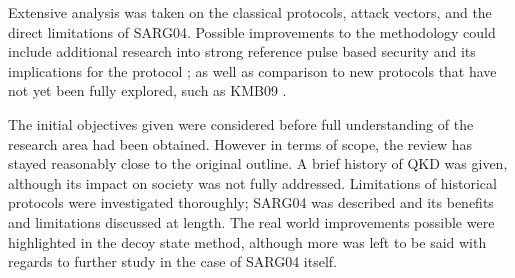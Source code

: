 \documentclass[paper=a4, fontsize=11pt]{scrartcl} %
\numberwithin{equation}{section} %
\numberwithin{figure}{section} %
\numberwithin{table}{section} %
\begin{document}
Extensive analysis was taken on the classical protocols, attack vectors, and the direct limitations of SARG04. Possible improvements
to the methodology could include additional research into strong reference pulse based security and its implications for the protocol \citep{koashi2004};
as well as comparison to new protocols that have not yet been fully explored, such as KMB09 \citep{KMB09}.

The initial objectives given were considered before full understanding of the research area had been obtained. However
in terms of scope, the review has stayed reasonably close to the original outline. A brief history of QKD was given, although
its impact on society was not fully addressed. Limitations of historical protocols were investigated thoroughly; SARG04 was described
and its benefits and limitations discussed at length. The real world improvements possible were highlighted in the decoy state
method, although more was left to be said with regards to further study in the case of SARG04 itself.




\clearpage


\clearpage
\printnoidxglossaries
\end{document}
